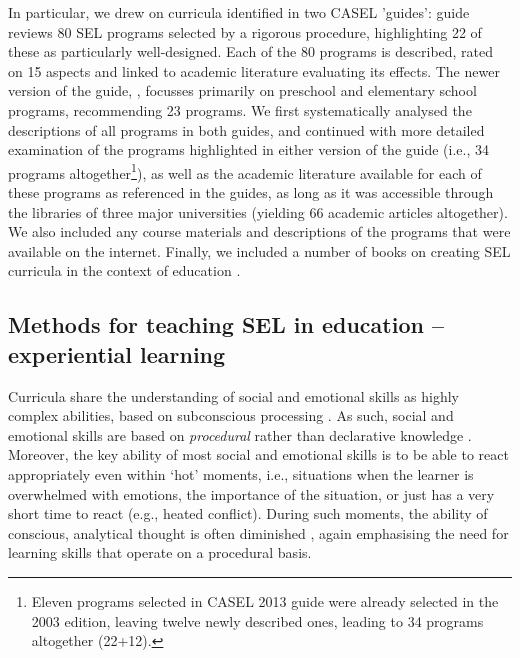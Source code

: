 \documentclass[prodmode,acmtochi]{acmsmall}
\newcommand{\GeraldineTODO}[1]{}
\begin{document}
In particular, we drew on curricula identified in two CASEL 'guides':  guide reviews 80 SEL programs selected by a rigorous procedure, highlighting 22 of
 these as particularly well-designed. Each of the 80 programs is described, rated on 15 aspects and linked to academic literature evaluating its effects. The newer version of the guide, , focusses primarily on preschool and elementary school programs, recommending 23 programs.
%
We first systematically analysed the descriptions of all programs in both guides, and continued with more detailed examination of the programs highlighted in either version of the guide (i.e., 34 programs altogether\footnote{Eleven programs selected in CASEL 2013 guide were already selected in the 2003 edition, leaving twelve newly described ones, leading to 34 programs altogether (22+12). \GeraldineTODO{LIST\ THESE\ BY\ NAME\ HERE\ AS\ COMPLETE\ LIST?}}), as well as the academic literature available for each of these programs as referenced in the guides, as long as it was accessible through the libraries of three major universities (yielding 66 academic articles altogether). We also included any course materials and descriptions of the programs that were available on the internet. Finally, we included a number of books on creating SEL curricula in the context of education \cite{Maree2007,Elias1997,Pasi2001,Zins2004,Patrikakou2005}. 








\subsection{Methods for teaching SEL in education -- experiential learning}
\label{sec:methods}

Curricula share the understanding of social and emotional skills as highly complex abilities, based on subconscious processing \cite{Ambady2010,Lieberman2000}. As such, social and emotional skills are based on \emph{procedural} rather than declarative knowledge \cite[p.288]{kruglanski2007social}. Moreover, the key ability of most social and emotional skills is to be able to react appropriately even within `hot' moments, i.e., situations  when the learner is overwhelmed with emotions, the importance of the situation, or just has a very short time to react (e.g., heated conflict). During such moments, the ability of conscious, analytical thought is often diminished \cite{Wyman2010,leDoux1998}, again emphasising the need for learning skills that operate on a procedural basis.
\end{document}
